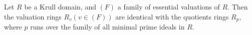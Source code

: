 Let $R$ be a Krull domain, and $(F)$ a family of essential valuations of $R$. Then the valuation rings $R_v(v \in (F))$ are identical with the quotients rings $R_p$, where $p$ runs over the family of all minimal prime ideals in $R$.
